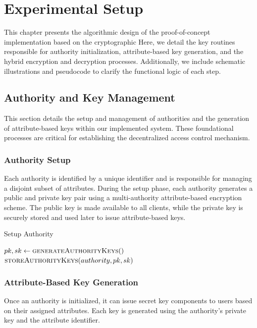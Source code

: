 \documentclass[cic,tc,english]{iiufrgs}
\begin{document}
\chapter{Experimental Setup}
\label{chap:experimentalsetup}

    This chapter presents the algorithmic design of the proof-of-concept implementation based on the cryptographic Here, we detail the key routines responsible for authority initialization, attribute-based key generation, and the hybrid encryption and decryption processes. Additionally, we include schematic illustrations and pseudocode to clarify the functional logic of each step.

    \section{Authority and Key Management}
    \label{sec:authority-key-management}

        This section details the setup and management of authorities and the generation of attribute-based keys within our implemented system. These foundational processes are critical for establishing the decentralized access control mechanism.

        \subsection{Authority Setup}

            Each authority is identified by a unique identifier and is responsible for managing a disjoint subset of attributes. During the setup phase, each authority generates a public and private key pair using a multi-authority attribute-based encryption scheme. The public key is made available to all clients, while the private key is securely stored and used later to issue attribute-based keys.

            \begin{algorithm}
                \caption{Setup Authority}
                \label{alg:setup_authority}
                \begin{algorithmic}[1]
                    \State $pk, sk \gets \textsc{generateAuthorityKeys}()$
                    \State $\textsc{storeAuthorityKeys}(authority, pk, sk)$
                \EndProcedure
                \end{algorithmic}
            \end{algorithm}

        \subsection{Attribute-Based Key Generation}
            Once an authority is initialized, it can issue secret key components to users based on their assigned attributes. Each key is generated using the authority's private key and the attribute identifier.
\end{document}
